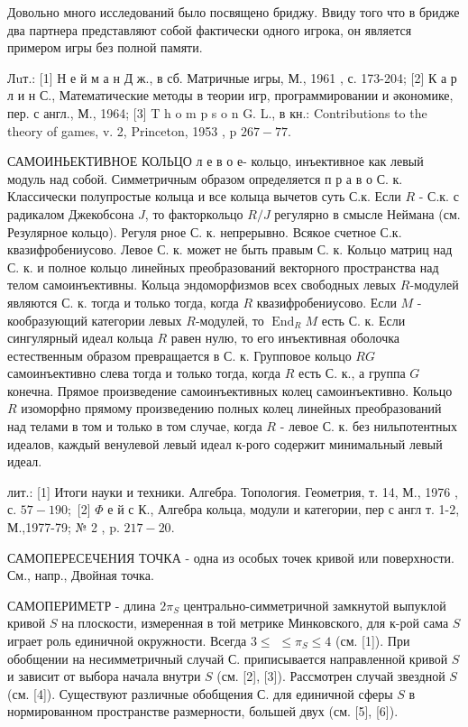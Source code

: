 \documentclass[10pt]{article}
\begin{document}
Довольно много исследований было посвящено бриджу. Ввиду того что в бридже два партнера представляют собой фактически одного игрока, он является примером игры без полной памяти.



Лuт.: [1] Н е й м а н Д ж., в сб. Матричные игры, М., 1961 , с. 173-204; [2] К а р л и н С., Математические методы в теории игр, программировании и әкономике, пер. с англ., М., 1964; [3] T h o m p s o n G. L., в кн.: Contributions to the theory of games, v. 2, Princeton, 1953 , p $267-77$.



САМОИНЬЕКТИВНОЕ КОЛЬЦО л е в о е- кольцо, инъективное как левый модуль над собой. Симметричным образом определяется п р а в о С. к. Классически полупростые колыца и все колыца вычетов суть С.к. Если $R$ - С.к. с радикалом Джекобсона $J$, то факторкольцо $R / J$ регулярно в смысле Неймана (см. Резулярное кольцо). Регуля рное С. к. непрерывно. Всякое счетное С.к. квазифробениусово. Левое С. к. может не быть правым С. к. Кольцо матриц над С. к. и полное кольцо линейных преобразований векторного пространства над телом самоинъективны. Кольца эндоморфизмов всех свободных левых $R$-модулей являются С. к. тогда и только тогда, когда $R$ квазифробениусово. Если $M$ - кообразующий категории левых $R$-модулей, то $\operatorname{End}_{R} M$ есть С. к. Если сингулярный идеал кольца $R$ равен нулю, то его инъективная оболочка естественным образом превращается в С. к. Групповое кольцо $R G$ самоинъективно слева тогда и только тогда, когда $R$ есть С. к., а группа $G$ конечна. Прямое произведение самоинъективных колец самоинъективно. Кольцо $R$ изоморфно прямому произведению полных колец линейных преобразований над телами в том и только в том случае, когда $R$ - левое С. к. без нильпотентных идеалов, каждый венулевой левый идеал к-рого содержит минимальный левый идеал.



лит.: [1] Итоги науки и техники. Алгебра. Топология. Геометрия, т. 14, М., 1976 , с. $57-190 ;$ [2] $\Phi$ е й с К., Алгебра кольца, модули и категории, пер с англ т. 1-2, М.,1977-79; № 2 , p. $217-20$.



САМОПЕРЕСЕЧЕНИЯ ТОЧКА - одна из особых точек кривой или поверхности. См., напр., Двойная точка.



САМОПЕРИМЕТР - длина $2 \pi_{S}$ центрально-симметричной замкнутой выпуклой кривой $S$ на плоскости, измеренная в той метрике Минковского, для к-рой сама $S$ играет роль единичной окружности. Всегда $3 \leqslant$ $\leqslant \pi_{S} \leqslant 4$ (см. [1]). При обобщении на несимметричный случай С. приписывается направленной кривой $S$ и зависит от выбора начала внутри $S$ (см. [2], [3]). Рассмотрен случай звездной $S$ (см. [4]). Существуют различные обобщения С. для единичной сферы $S$ в нормированном пространстве размерности, большей двух (см. [5], [6]).
\end{document}
